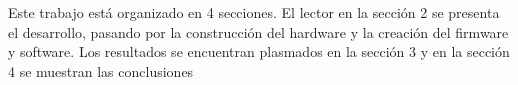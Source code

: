  Este trabajo está organizado en 4 secciones. El lector en la sección 2 se presenta el desarrollo, pasando por la construcción del hardware y la creación del firmware y software. Los resultados se encuentran plasmados en la sección 3 y en la sección 4 se muestran las conclusiones\\
 
 
